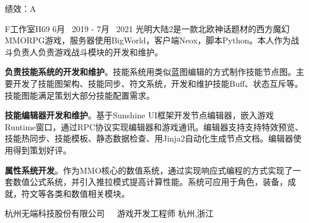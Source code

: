 \begin{cventries}
\cventrycompany
{绩效：A} %
{~} %

\cventryproject
{F工作室H69} %
{6月~ 2019 - 7月~ 2021} %
{光明大陆2是一款北欧神话题材的西方魔幻MMORPG游戏，服务器使用BigWorld，客户端Neox，脚本Python。本人作为战斗负责人负责游戏战斗模块的开发和维护。}
{ %
	\begin{cvitems}
		\item {\textbf{负责技能系统的开发和维护}。技能系统用类似蓝图编辑的方式制作技能节点图。主要开发了技能图架构、技能同步、符文系统，开发和维护技能Buff、状态互斥等。技能图能满足策划大部分技能配置需求。}
		\item{\textbf{技能编辑器开发和维护}。基于Sunshine UI框架开发节点编辑器，嵌入游戏Runtime窗口，通过RPC协议实现编辑器和游戏通讯。编辑器支持支持特效预览、技能热同步、技能模板、静态数据检查、用Jinja2自动化生成节点文档。编辑器使用得到策划好评。}
		\item{\textbf{属性系统开发}。作为MMO核心的数值系统，通过实现响应式编程的方式实现了一套数值公式系统，并引入推拉模式提高计算性能。系统可应用于角色，装备，成就，符文等各类和数值相关模块。}
	\end{cvitems}
}



\cventrycompany
{杭州无端科技股份有限公司~~~游戏开发工程师} %
{杭州,浙江} %


\end{cventries}

